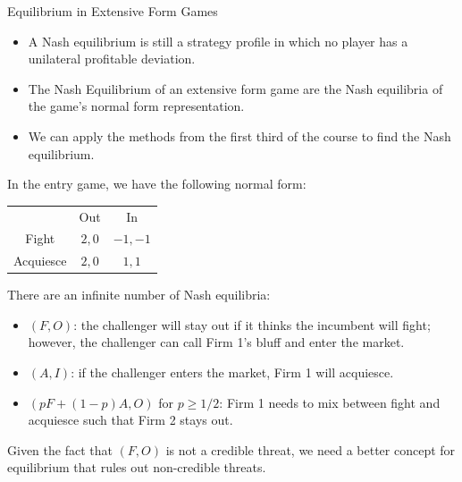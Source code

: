 \documentclass[8pt]{extarticle}
\begin{document}
  \begin{problem}{Equilibrium in Extensive Form Games}
    \begin{itemize}
      \item A Nash equilibrium is still a strategy profile in which no player has a unilateral profitable deviation.
      \item The Nash Equilibrium of an extensive form game are the Nash equilibria of the game's normal form representation.
      \item We can apply the methods from the first third of the course to find the Nash equilibrium.
    \end{itemize}
    In the entry game, we have the following normal form:
    \begin{center}
      \renewcommand{\arraystretch}{1.5}
      \begin{tabular}{c|c|c|}
        \multicolumn{1}{c}{} & \multicolumn{1}{c}{Out} & \multicolumn{1}{c}{In}\\
        \cline{2-3}
        Fight & $2,0$ & $-1,-1$\\
        \cline{2-3}
        Acquiesce & $2,0$ & $1,1$\\
        \cline{2-3}
      \end{tabular}
    \end{center}
    There are an infinite number of Nash equilibria:
    \begin{itemize}
      \item $(F,O)$: the challenger will stay out if it thinks the incumbent will fight; however, the challenger can call Firm 1's bluff and enter the market.
      \item $(A,I)$: if the challenger enters the market, Firm 1 will acquiesce.
      \item $(pF + (1-p)A, O)$ for $p \geq 1/2$: Firm 1 needs to mix between fight and acquiesce such that Firm 2 stays out.
    \end{itemize}
    Given the fact that $(F,O)$ is not a credible threat, we need a better concept for equilibrium that rules out non-credible threats.\newline


\end{problem}
\end{document}
